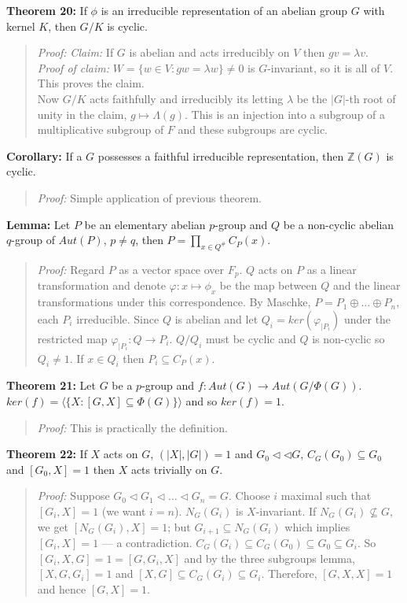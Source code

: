 {\bf Theorem 20:}
If $\phi$ is an irreducible representation of an abelian group $G$ with kernel $K$, then
$G/K$ is cyclic.
\begin{quote}
\emph{Proof:}  
\emph{Claim:} If $G$ is abelian and acts irreducibly on $V$ then $gv= \lambda v$.\\
\emph{Proof of claim:}  $W= \{ w \in V: gw= \lambda w \} \ne 0$ is $G$-invariant,
so it is all of $V$.  This proves the claim.\\
Now 
$G/K$ acts faithfully and irreducibly its letting $\lambda$ be the
$|G|$-th root of unity in the claim, $g \mapsto \Lambda(g)$.  This is an injection into
a subgroup of a multiplicative subgroup of $F$ and these subgroups are cyclic.
\end{quote}
{\bf Corollary:}  If a $G$ possesses a faithful irreducible representation, then
${\mathbb Z}(G)$ is cyclic.
\begin{quote}
\emph{Proof:}  
Simple application of previous theorem.
\end{quote}
{\bf Lemma:} Let $P$ be an elementary abelian $p$-group and $Q$ be a non-cyclic
abelian $q$-group of $Aut(P)$, $p \ne q$, then $P= \prod_{x \in Q^{\#}} C_P(x)$.
\begin{quote}
\emph{Proof:}  
Regard $P$ as a vector space over $F_p$.  $Q$ acts on $P$ as a linear transformation
and denote $\varphi: x \mapsto \phi_x$ be the map between $Q$ and the linear transformations
under this correspondence.
By Maschke, $P= P_1 \oplus \ldots \oplus P_n$, each $P_i$ irreducible.  Since
$Q$ is abelian and let $Q_i= ker(\varphi_{|P_i})$ under the 
restricted map $\varphi_{|P_i}: Q \rightarrow P_i$.  $Q/Q_i$ must be cyclic and
$Q$ is non-cyclic so $Q_i \ne 1$.  If $x \in Q_i$ then $P_i \subseteq C_P(x)$.
\end{quote}
{\bf Theorem 21:}
Let $G$ be a $p$-group and
$f: Aut(G) \rightarrow Aut(G/\Phi(G))$.  
$ker(f)= \langle \{ X: [G, X] \subseteq \Phi(G) \} \rangle$ and so $ker(f) = 1$.
\begin{quote}
\emph{Proof:}  
This is practically the definition.
\end{quote}
{\bf Theorem 22:}
If $X$ acts on $G$, $(|X|, |G|)= 1$ and $G_0 \lhd \lhd G$, $C_G(G_0) \subseteq G_0$ and
$[G_0 , X] =1$ then $X$ acts trivially on $G$.
\begin{quote}
\emph{Proof:}  
Suppose $G_0 \lhd G_1 \lhd \ldots \lhd G_n = G$.  Choose $i$ maximal such that
$[G_i, X]= 1$ (we want $i=n$).  $N_G(G_i)$ is $X$-invariant.  If
$N_G(G_i) \nsubseteq G$, we get $[N_G(G_i ), X]= 1$; but $G_{i+1} \subseteq N_G(G_i )$ which
implies $[G_i, X]= 1$ --- a contradiction.
$C_G(G_i ) \subseteq C_G(G_0) \subseteq G_0 \subseteq G_i$.
So $[G_i, X, G]=1= [G, G_i, X]$ and by the three subgroups lemma,
$[X,G,G_i]= 1$ and $[X,G] \subseteq C_G(G_i) \subseteq G_i$.
Therefore, $[G,X,X]=1$ and hence $[G,X]= 1$.
\end{quote}
